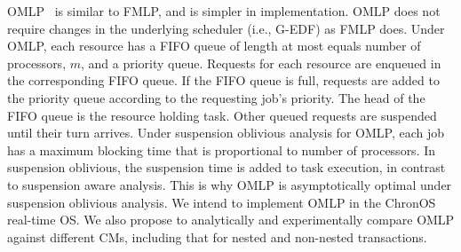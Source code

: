 \documentclass[12pt,english]{report}
\begin{document}
OMLP~\cite{key-3} is similar to FMLP, and is simpler in implementation. OMLP does not require changes in the underlying scheduler (i.e., G-EDF) as FMLP does. Under OMLP, each resource has a FIFO queue of length at most equals number of processors, $m$, and a priority queue. Requests for each resource are enqueued in the corresponding FIFO queue. If the FIFO queue is full, requests are added to the priority queue according to the requesting job's priority. The head of the FIFO queue is the resource holding task. Other queued requests are suspended until their turn arrives. Under suspension oblivious analysis for OMLP, each job has a maximum blocking time that is proportional to number of processors. In suspension oblivious, the suspension time is added to task execution, in contrast to suspension aware analysis. This is why
OMLP is asymptotically optimal under suspension oblivious analysis. We intend to implement OMLP in the ChronOS real-time OS. We also propose to analytically and experimentally compare OMLP against different CMs, including that for nested and non-nested transactions.



\pagebreak 
{}





%
%

%
\end{document}
